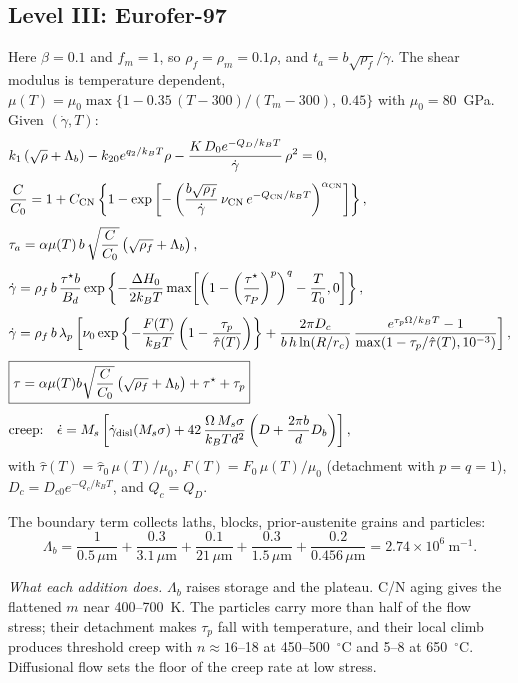 \documentclass[11pt]{article}
\newcommand{\gd}{\dot\gamma}
\newcommand{\ts}{\tau^{\star}}
\newcommand{\kT}{k_BT}
\numberwithin{equation}{section}
\begin{document}
\clearpage
\subsection{Level III: Eurofer-97}
\begin{matbox}
Here $\beta=0.1$ and $f_m=1$, so $\rho_f=\rho_m=0.1\rho$, and $t_a=b\sqrt{\rho_f}/\gd$. The shear modulus is temperature dependent,
$\mu(T)=\mu_0\max\{1-0.35\,(T-300)/(T_m-300),\ 0.45\}$ with $\mu_0=80$~GPa.
Given $(\gd,T)$:
\begin{align}
&k_1\left(\sqrt\rho+\Lambda_b\right)-k_{20}e^{q_2/\kT}\rho-\frac{K\,D_0e^{-Q_D/\kT}}{\gd}\,\rho^2=0,\\[4pt]
&\frac{C}{C_0}=1+C_{\rm CN}\left\{1-\exp\left[-\left(\frac{b\sqrt{\rho_f}}{\gd}\,\nu_{\rm CN}\,e^{-Q_{\rm CN}/\kT}\right)^{\alpha_{\rm CN}}\right]\right\},\\[4pt]
&\tau_a=\alpha\mu(T)\,b\,\sqrt{\frac{C}{C_0}}\left(\sqrt{\rho_f}+\Lambda_b\right),\\[4pt]
&\gd=\rho_f\,b\,\frac{\ts b}{B_d}\exp\left\{-\frac{\Delta H_0}{2\kT}\max\!\left[\left(1-\left(\frac{\ts}{\tau_P}\right)^{p}\right)^{q}-\frac{T}{T_0},0\right]\right\},\\[4pt]
&\gd=\rho_f\,b\,\lambda_p\left[\nu_0\exp\left\{-\frac{F(T)}{\kT}\left(1-\frac{\tau_p}{\hat\tau(T)}\right)\right\}
+\frac{2\pi D_c}{b\,h\ln(R/r_c)}\,\frac{e^{\tau_p\Omega/\kT}-1}{\max(1-\tau_p/\hat\tau(T),10^{-3})}\right],\\[4pt]
&\boxed{\tau=\alpha\mu(T)b\sqrt{\frac{C}{C_0}}\left(\sqrt{\rho_f}+\Lambda_b\right)+\ts+\tau_p}\\[4pt]
&\text{creep:}\quad \dot\epsilon=M_s\left[\gd_{\rm disl}(M_s\sigma)+42\,\frac{\Omega\,M_s\sigma}{\kT d^2}\left(D+\frac{2\pi b}{d}D_b\right)\right],
\end{align}
with $\hat\tau(T)=\hat\tau_0\,\mu(T)/\mu_0$, $F(T)=F_0\,\mu(T)/\mu_0$ (detachment with $p=q=1$), $D_c=D_{c0}e^{-Q_c/\kT}$, and $Q_c=Q_D$.

The boundary term collects laths, blocks, prior-austenite grains and particles:
\begin{equation}
\Lambda_b=\frac{1}{0.5\,\mu\mathrm{m}}+\frac{0.3}{3.1\,\mu\mathrm{m}}+\frac{0.1}{21\,\mu\mathrm{m}}+\frac{0.3}{1.5\,\mu\mathrm{m}}+\frac{0.2}{0.456\,\mu\mathrm{m}}=2.74\times10^6~\mathrm{m}^{-1}.
\end{equation}

\emph{What each addition does.} $\Lambda_b$ raises storage and the plateau. C/N aging gives the flattened $m$ near 400--700~K. The particles carry more than half of the flow stress; their detachment makes $\tau_p$ fall with temperature, and their local climb produces threshold creep with $n\approx16$--18 at 450--500~$^\circ$C and 5--8 at 650~$^\circ$C. Diffusional flow sets the floor of the creep rate at low stress.


\end{matbox}
\end{document}
